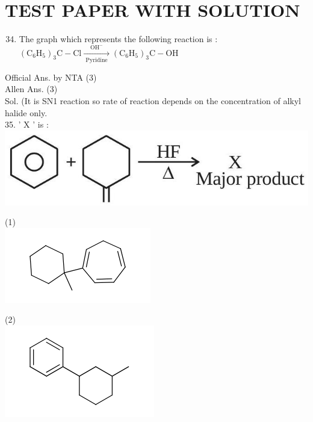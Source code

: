 \documentclass[10pt]{article}
\begin{document}
\section*{TEST PAPER WITH SOLUTION}
\begin{enumerate}
  \setcounter{enumi}{33}
  \item The graph which represents the following reaction is :\\
\(\left(\mathrm{C}_{6} \mathrm{H}_{5}\right)_{3} \mathrm{C}-\mathrm{Cl} \xrightarrow[\text { Pyridine }]{\mathrm{OH}^{-}}\left(\mathrm{C}_{6} \mathrm{H}_{5}\right)_{3} \mathrm{C}-\mathrm{OH}\)
\end{enumerate}

Official Ans. by NTA (3)\\
Allen Ans. (3)\\
Sol. (It is SN1 reaction so rate of reaction depends on the concentration of alkyl halide only.\\
35. ' X ' is :\\
\includegraphics[max width=\textwidth, center]{2025_10_02_a54bf82dc4585184bb5fg-1(2)}

(1)\\
\includegraphics{smile-435b183677c4efdcfc56c64225a692e989160456}

(2)\\
\includegraphics{smile-d7457d92db6bb63e8440253d18ad2e4b48b61956}
\end{document}

